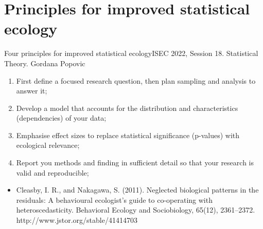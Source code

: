 \documentclass{beamer}
\begin{document}
\section{Principles for improved statistical ecology}

\begin{frame}{Four principles for improved statistical ecology}{ISEC 2022, Session 18. Statistical Theory. Gordana Popovic}

\begin{enumerate}
    \item First define a focused research question, then plan sampling and analysis to answer it; 
    \item Develop a model that accounts for the distribution and characteristics (dependencies) of your data;
    \item Emphasise effect sizes to replace statistical significance (p-values) with ecological relevance;
    \item Report you methods and finding in sufficient detail so that your research is valid and reproducible;
\end{enumerate}
\end{frame}

\begin{frame}

\begin{itemize}
	\item Cleasby, I. R., and Nakagawa, S. (2011). Neglected biological patterns in the residuals: A behavioural ecologist’s guide to co-operating with heteroscedasticity. Behavioral Ecology and Sociobiology, 65(12), 2361–2372. http://www.jstor.org/stable/41414703
\end{itemize}
\end{frame}
\end{document}
